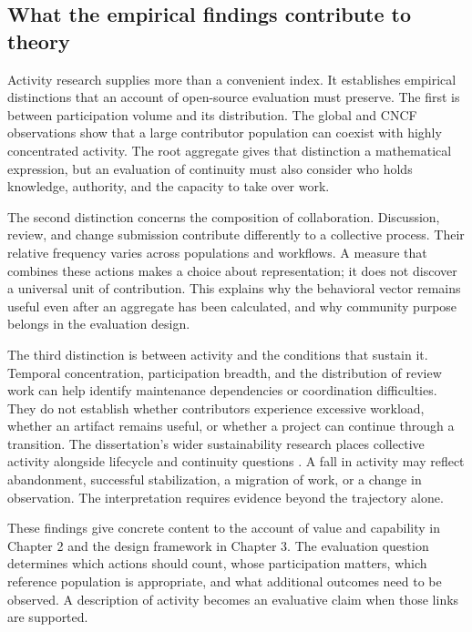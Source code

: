 \subsection{What the empirical findings contribute to theory}
Activity research supplies more than a convenient index. It establishes empirical distinctions that an account of open-source evaluation must preserve. The first is between participation volume and its distribution. The global and CNCF observations show that a large contributor population can coexist with highly concentrated activity. The root aggregate gives that distinction a mathematical expression, but an evaluation of continuity must also consider who holds knowledge, authority, and the capacity to take over work.

The second distinction concerns the composition of collaboration. Discussion, review, and change submission contribute differently to a collective process. Their relative frequency varies across populations and workflows. A measure that combines these actions makes a choice about representation; it does not discover a universal unit of contribution. This explains why the behavioral vector remains useful even after an aggregate has been calculated, and why community purpose belongs in the evaluation design.

The third distinction is between activity and the conditions that sustain it. Temporal concentration, participation breadth, and the distribution of review work can help identify maintenance dependencies or coordination difficulties. They do not establish whether contributors experience excessive workload, whether an artifact remains useful, or whether a project can continue through a transition. The dissertation's wider sustainability research places collective activity alongside lifecycle and continuity questions \citep{xia2024thesis}. A fall in activity may reflect abandonment, successful stabilization, a migration of work, or a change in observation. The interpretation requires evidence beyond the trajectory alone.

These findings give concrete content to the account of value and capability in Chapter 2 and the design framework in Chapter 3. The evaluation question determines which actions should count, whose participation matters, which reference population is appropriate, and what additional outcomes need to be observed. A description of activity becomes an evaluative claim when those links are supported.

